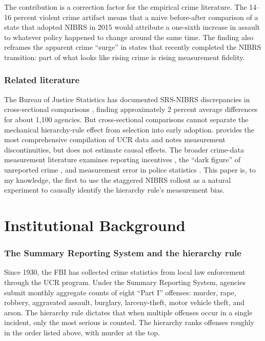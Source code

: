 \documentclass[12pt]{article}
\begin{document}
The contribution is a correction factor for the empirical crime literature. The 14--16 percent violent crime artifact means that a naive before-after comparison of a state that adopted NIBRS in 2015 would attribute a one-sixth increase in assault to whatever policy happened to change around the same time. The finding also reframes the apparent crime ``surge'' in states that recently completed the NIBRS transition: part of what looks like rising crime is rising measurement fidelity.

\subsubsection*{Related literature} The Bureau of Justice Statistics has documented SRS-NIBRS discrepancies in cross-sectional comparisons \citep{rantala2000effects}, finding approximately 2 percent average differences for about 1,100 agencies. But cross-sectional comparisons cannot separate the mechanical hierarchy-rule effect from selection into early adoption. \citet{kaplan2021ucr} provides the most comprehensive compilation of UCR data and notes measurement discontinuities, but does not estimate causal effects. The broader crime-data measurement literature examines reporting incentives \citep{maltz1999bridging}, the ``dark figure'' of unreported crime \citep{biderman1967nature}, and measurement error in police statistics \citep{pepper2004quantitative}. This paper is, to my knowledge, the first to use the staggered NIBRS rollout as a natural experiment to causally identify the hierarchy rule's measurement bias.

\section{Institutional Background}

\subsubsection*{The Summary Reporting System and the hierarchy rule} Since 1930, the FBI has collected crime statistics from local law enforcement through the UCR program. Under the Summary Reporting System, agencies submit monthly aggregate counts of eight ``Part I'' offenses: murder, rape, robbery, aggravated assault, burglary, larceny-theft, motor vehicle theft, and arson. The hierarchy rule dictates that when multiple offenses occur in a single incident, only the most serious is counted. The hierarchy ranks offenses roughly in the order listed above, with murder at the top.
\end{document}
